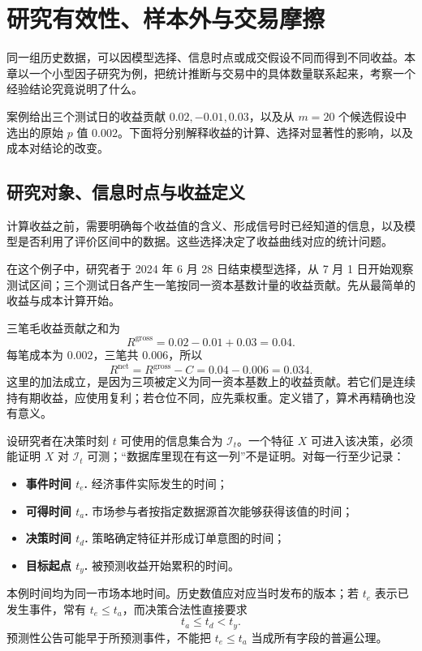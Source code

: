 \chapter{研究有效性、样本外与交易摩擦}
\label{ch:research-validity}

同一组历史数据，可以因模型选择、信息时点或成交假设不同而得到不同收益。本章以一个小型因子研究为例，把统计推断与交易中的具体数量联系起来，考察一个经验结论究竟说明了什么。

案例给出三个测试日的收益贡献 $0.02,-0.01,0.03$，以及从 $m=20$ 个候选假设中选出的原始 $p$ 值 $0.002$。下面将分别解释收益的计算、选择对显著性的影响，以及成本对结论的改变。

\section{研究对象、信息时点与收益定义}

计算收益之前，需要明确每个收益值的含义、形成信号时已经知道的信息，以及模型是否利用了评价区间中的数据。这些选择决定了收益曲线对应的统计问题。

在这个例子中，研究者于 2024 年 6 月 28 日结束模型选择，从 7 月 1 日开始观察测试区间；三个测试日各产生一笔按同一资本基数计量的收益贡献。先从最简单的收益与成本计算开始。

\begin{example}
三笔毛收益贡献之和为
\[
  R^{\mathrm{gross}}=0.02-0.01+0.03=0.04.
\]
每笔成本为 $0.002$，三笔共 $0.006$，所以
\[
  R^{\mathrm{net}}=R^{\mathrm{gross}}-C=0.04-0.006=0.034.
\]
这里的加法成立，是因为三项被定义为同一资本基数上的收益贡献。若它们是连续持有期收益，应使用复利；若仓位不同，应先乘权重。定义错了，算术再精确也没有意义。
\end{example}


设研究者在决策时刻 $t$ 可使用的信息集合为 $\mathcal I_t$。一个特征 $X$ 可进入该决策，必须能证明 $X$ 对 $\mathcal I_t$ 可测；“数据库里现在有这一列”不是证明。对每一行至少记录：
\begin{itemize}
  \item \textbf{事件时间 $t_e$.} 经济事件实际发生的时间；
  \item \textbf{可得时间 $t_a$.} 市场参与者按指定数据源首次能够获得该值的时间；
  \item \textbf{决策时间 $t_d$.} 策略确定特征并形成订单意图的时间；
  \item \textbf{目标起点 $t_y$.} 被预测收益开始累积的时间。
\end{itemize}
本例时间均为同一市场本地时间。历史数值应对应当时发布的版本；若 $t_e$ 表示已发生事件，常有 $t_e\leq t_a$，而决策合法性直接要求
\[
 t_a\leq t_d<t_y.
\]
预测性公告可能早于所预测事件，不能把 $t_e\leq t_a$ 当成所有字段的普遍公理。

